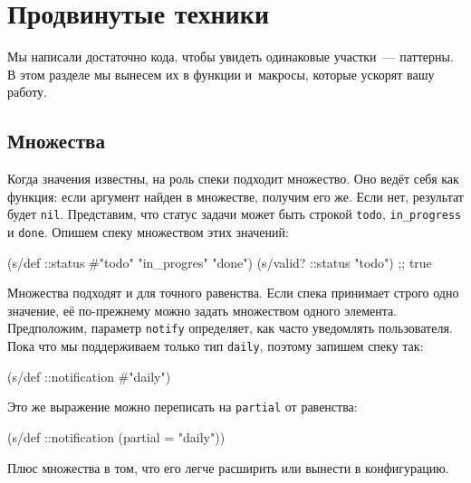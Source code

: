 \section{Продвинутые техники}


Мы написали достаточно кода, чтобы увидеть одинаковые участки~--- паттерны. В
этом разделе мы вынесем их в функции и~макросы, которые ускорят вашу работу.

\subsection{Множества}


Когда значения известны, на роль спеки подходит множество. Оно ведёт себя как
функция: если аргумент найден в множестве, получим его же. Если нет, результат
будет \verb|nil|. Представим, что статус задачи может быть строкой
\verb|todo|, \verb|in_progress| и \verb|done|. Опишем спеку множеством
этих значений:

\begin{english}
  \begin{clojure}
(s/def ::status #{"todo" "in_progres" "done"})
(s/valid? ::status "todo") ;; true
  \end{clojure}
\end{english}

Множества подходят и для точного равенства. Если спека принимает строго одно
значение, её по-прежнему можно задать множеством одного
элемента. Предположим, параметр \verb|notify| определяет, как часто уведомлять
пользователя. Пока что мы поддерживаем только тип \verb|daily|, поэтому
запишем спеку так:

\begin{english}
  \begin{clojure}
(s/def ::notification #{"daily"})
  \end{clojure}
\end{english}

\noindent
Это же выражение можно переписать на \verb|partial| от равенства:

\begin{english}
  \begin{clojure}
(s/def ::notification (partial = "daily"))
  \end{clojure}
\end{english}

\noindent
Плюс множества в том, что его легче расширить или вынести в конфигурацию.

